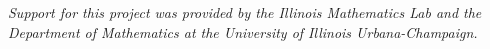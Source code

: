 \documentclass[landscape]{sciposter}
\begin{document}
\vfill
 {}\centerline{\emph{
Support for this project was provided by the Illinois Mathematics Lab and the Department of Mathematics at the University of Illinois Urbana-Champaign.}}
\end{document}
